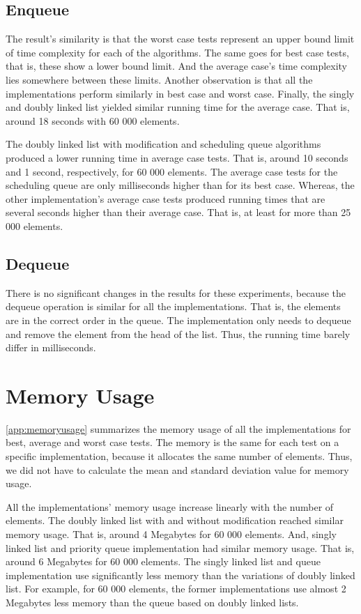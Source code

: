 \documentclass[a4paper,11pt]{kth-mag}
\newcommand*{\skippara}{\par\vspace{\baselineskip} \noindent}
\begin{document}
\subsection{Enqueue}
The result's similarity is that the worst case tests represent an upper bound limit of time complexity for each of the algorithms.
The same goes for best case tests, that is, these show a lower bound limit.
And the average case's time complexity lies somewhere between these limits.
Another observation is that all the implementations perform similarly in best case and worst case.
Finally, the singly and doubly linked list yielded similar running time for the average case.
That is, around 18 seconds with 60 000 elements.

\skippara The doubly linked list with modification and scheduling queue algorithms produced a lower running time in average case tests.
That is, around 10 seconds and 1 second, respectively, for 60 000 elements.
The average case tests for the scheduling queue are only milliseconds higher than for its best case.
Whereas, the other implementation's average case tests produced running times that are several seconds higher than their average case.
That is, at least for more than 25 000 elements.



\subsection{Dequeue}

There is no significant changes in the results for these experiments, because the dequeue operation is similar for all the implementations.
That is, the elements are in the correct order in the queue.
The implementation only needs to dequeue and remove the element from the head of the list.
Thus, the running time barely differ in milliseconds.

\section{Memory Usage}

\cref{app:memoryusage} summarizes the memory usage of all the implementations for best, average and worst case tests.
The memory is the same for each test on a specific implementation, because it allocates the same number of elements.
Thus, we did not have to calculate the mean and standard deviation value for memory usage.

\skippara All the implementations' memory usage increase linearly with the number of elements.
The doubly linked list with and without modification reached similar memory usage.
That is, around 4 Megabytes for 60 000 elements.
And, singly linked list and priority queue implementation had similar memory usage.
That is, around 6 Megabytes for 60 000 elements.
The singly linked list and queue implementation use significantly less memory than the variations of doubly linked list.
For example, for 60 000 elements, the former implementations use almost 2 Megabytes less memory than the queue based on doubly linked lists.
\end{document}
